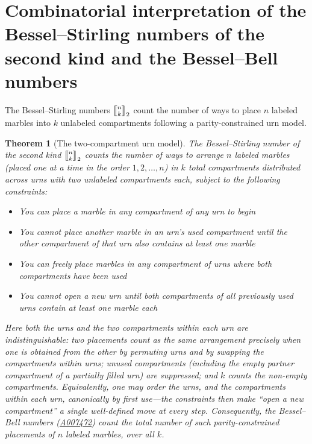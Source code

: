 \documentclass[a4paper]{amsart}
\numberwithin{equation}{section}
\newcommand{\mStirling}[0]{\genfrac{\llbracket}{\rrbracket}{0pt}{}}
\newtheorem{theorem}{Theorem}[section]
\begin{document}
\section{Combinatorial interpretation of the Bessel--Stirling numbers of the second kind and the Bessel--Bell numbers}\label{sec-combinatorial}
\noindent The Bessel--Stirling numbers $\mStirling{n}{k}_2$ count the number of ways to place $n$ labeled marbles into $k$ unlabeled compartments following a parity-constrained urn model.
\begin{theorem}[The two-compartment urn model]\label{thm-urn-model}
The Bessel--Stirling number of the second kind $\mStirling{n}{k}_2$ counts the number of ways to arrange $n$ labeled marbles (placed one at a time in the order $1, 2, \ldots, n$) in $k$ total compartments distributed across urns with two unlabeled compartments each, subject to the following constraints:
\begin{itemize}
    \renewcommand\labelitemi{--}
    \item You can place a marble in any compartment of any urn to begin
    \item You cannot place another marble in an urn's used compartment until the other compartment of that urn also contains at least one marble
    \item You can freely place marbles in any compartment of urns where both compartments have been used
    \item You cannot open a new urn until both compartments of all previously used urns contain at least one marble each
\end{itemize}
Here both the urns and the two compartments within each urn are indistinguishable: two placements count as the same arrangement precisely when one is obtained from the other by permuting urns and by swapping the compartments within urns; unused compartments (including the empty partner compartment of a partially filled urn) are suppressed; and $k$ counts the non-empty compartments. Equivalently, one may order the urns, and the compartments within each urn, canonically by first use---the constraints then make ``open a new compartment'' a single well-defined move at every step. Consequently, the Bessel--Bell numbers (\href{https://oeis.org/A007472}{A007472}) count the total number of such parity-constrained placements of $n$ labeled marbles, over all $k$.
\end{theorem}
\end{document}
